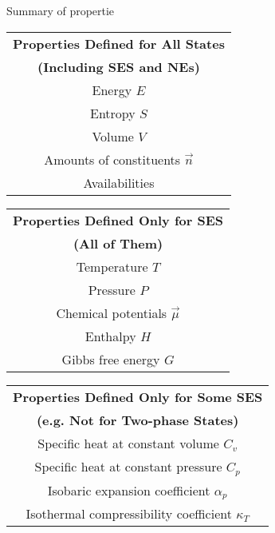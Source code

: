 \begin{add}
    Summary of propertie
    \begin{center} 
        \begin{minipage}{0.45\textwidth}
        \centering
        \begin{tabular}{|c|}
        \hline
        \textbf{Properties Defined for All States} \\
        \textbf{(Including SES and NEs)} \\ \hline
        Energy \(E\) \\ \hline
        Entropy \(S\) \\ \hline
        Volume \(V\) \\ \hline
        Amounts of constituents \(\vec{n}\) \\ \hline
        Availabilities \\ \hline
        \end{tabular}
        \end{minipage}
        \hfil
        \begin{minipage}{0.45\textwidth}
        \centering
        \begin{tabular}{|c|}
        \hline
        \textbf{Properties Defined Only for SES} \\
        \textbf{(All of Them)} \\ \hline
        Temperature \(T\) \\ \hline
        Pressure \(P\) \\ \hline
        Chemical potentials \(\vec{\mu}\) \\ \hline
        Enthalpy \(H\) \\ \hline
        Gibbs free energy \(G\) \\ \hline
        \end{tabular}
        \end{minipage}
        
        \begin{minipage}{0.7\textwidth}
        \centering
        \begin{tabular}{|c|}
        \hline
        \textbf{Properties Defined Only for Some SES} \\
        \textbf{(e.g. Not for Two-phase States)} \\ \hline
        Specific heat at constant volume \(C_v\) \\ \hline
        Specific heat at constant pressure \(C_p\) \\ \hline
        Isobaric expansion coefficient \(\alpha_p\) \\ \hline
        Isothermal compressibility coefficient \(\kappa_T\) \\ \hline
        \end{tabular}
        \end{minipage}
\end{center}
\end{add}
